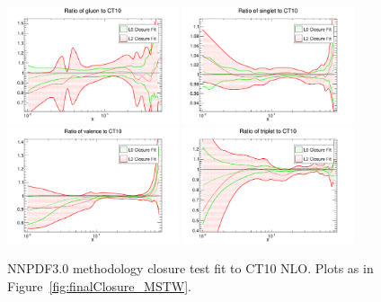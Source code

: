 \begin{figure}[!]
\centering
\includegraphics[width=0.45\textwidth]{7-PostLHC/figs/finalClosure/CT10/gluon.pdf}
\includegraphics[width=0.45\textwidth]{7-PostLHC/figs/finalClosure/CT10/singlet.pdf}
\includegraphics[width=0.45\textwidth]{7-PostLHC/figs/finalClosure/CT10/valence.pdf}
\includegraphics[width=0.45\textwidth]{7-PostLHC/figs/finalClosure/CT10/triplet.pdf}
\caption[NNPDF3.0 methodology closure test fit to CT10 NLO]{NNPDF3.0 methodology closure test fit to CT10 NLO. Plots as in Figure~\ref{fig:finalClosure_MSTW}. }
\label{fig:finalClosure_CT10}
\end{figure}

